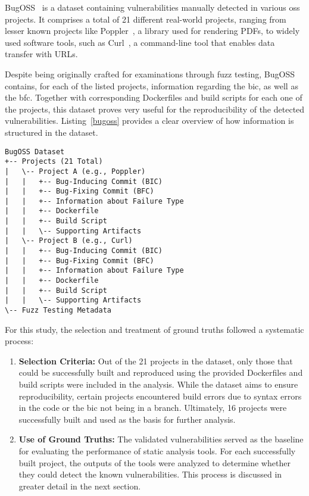 BugOSS~\cite{BugOSS} is a dataset containing vulnerabilities manually detected in various \acl{oss} projects.
It comprises a total of 21 different real-world projects, ranging from lesser known projects like Poppler~\cite{poppler}, a library used for rendering PDFs, to widely used software tools, such as Curl~\cite{curl}, a command-line tool that enables data transfer with URLs.

Despite being originally crafted for examinations through fuzz testing, BugOSS contains, for each of the listed projects, information regarding the \ac{bic}, as well as the \ac{bfc}. 
Together with corresponding Dockerfiles and build scripts for each one of the projects, this dataset proves very useful for the reproducibility of the detected vulnerabilities.
Listing~\ref{bugoss} provides a clear overview of how information is structured in the dataset.

\begin{lstlisting}[caption={Hierarchy of the BugOSS dataset}, label={bugoss}]
BugOSS Dataset
+-- Projects (21 Total)
|   \-- Project A (e.g., Poppler)
|   |   +-- Bug-Inducing Commit (BIC)
|   |   +-- Bug-Fixing Commit (BFC)
|   |   +-- Information about Failure Type
|   |   +-- Dockerfile
|   |   +-- Build Script
|   |   \-- Supporting Artifacts
|   \-- Project B (e.g., Curl)
|   |   +-- Bug-Inducing Commit (BIC)
|   |   +-- Bug-Fixing Commit (BFC)
|   |   +-- Information about Failure Type
|   |   +-- Dockerfile
|   |   +-- Build Script
|   |   \-- Supporting Artifacts
\-- Fuzz Testing Metadata
\end{lstlisting}

For this study, the selection and treatment of ground truths followed a systematic process:
\begin{enumerate}
    \item \textbf{Selection Criteria:} Out of the 21 projects in the dataset, only those that could be successfully built and reproduced using the provided Dockerfiles and build scripts were included in the analysis. While the dataset aims to ensure reproducibility, certain projects encountered build errors due to syntax errors in the code or the \ac{bic} not being in a branch. Ultimately, 16 projects were successfully built and used as the basis for further analysis.

    \item \textbf{Use of Ground Truths:} The validated vulnerabilities served as the baseline for evaluating the performance of static analysis tools. For each successfully built project, the outputs of the tools were analyzed to determine whether they could detect the known vulnerabilities. This process is discussed in greater detail in the next section.
\end{enumerate}